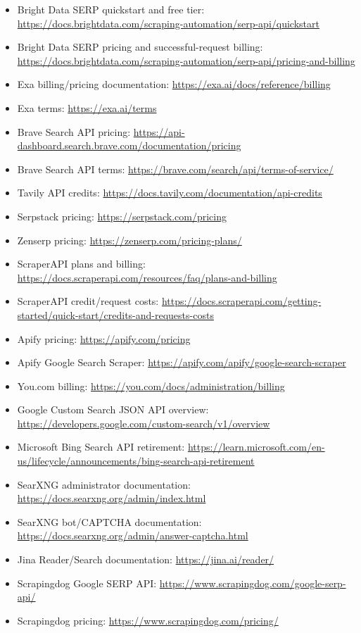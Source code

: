 \documentclass[11pt]{article}
\begin{document}
\begin{itemize}
\item Bright Data SERP quickstart and free tier:
\url{https://docs.brightdata.com/scraping-automation/serp-api/quickstart}
\item Bright Data SERP pricing and successful-request billing:
\url{https://docs.brightdata.com/scraping-automation/serp-api/pricing-and-billing}
\item Exa billing/pricing documentation:
\url{https://exa.ai/docs/reference/billing}
\item Exa terms:
\url{https://exa.ai/terms}
\item Brave Search API pricing:
\url{https://api-dashboard.search.brave.com/documentation/pricing}
\item Brave Search API terms:
\url{https://brave.com/search/api/terms-of-service/}
\item Tavily API credits:
\url{https://docs.tavily.com/documentation/api-credits}
\item Serpstack pricing:
\url{https://serpstack.com/pricing}
\item Zenserp pricing:
\url{https://zenserp.com/pricing-plans/}
\item ScraperAPI plans and billing:
\url{https://docs.scraperapi.com/resources/faq/plans-and-billing}
\item ScraperAPI credit/request costs:
\url{https://docs.scraperapi.com/getting-started/quick-start/credits-and-requests-costs}
\item Apify pricing:
\url{https://apify.com/pricing}
\item Apify Google Search Scraper:
\url{https://apify.com/apify/google-search-scraper}
\item You.com billing:
\url{https://you.com/docs/administration/billing}
\item Google Custom Search JSON API overview:
\url{https://developers.google.com/custom-search/v1/overview}
\item Microsoft Bing Search API retirement:
\url{https://learn.microsoft.com/en-us/lifecycle/announcements/bing-search-api-retirement}
\item SearXNG administrator documentation:
\url{https://docs.searxng.org/admin/index.html}
\item SearXNG bot/CAPTCHA documentation:
\url{https://docs.searxng.org/admin/answer-captcha.html}
\item Jina Reader/Search documentation:
\url{https://jina.ai/reader/}
\item Scrapingdog Google SERP API:
\url{https://www.scrapingdog.com/google-serp-api/}
\item Scrapingdog pricing:
\url{https://www.scrapingdog.com/pricing/}
\end{itemize}
\end{document}
